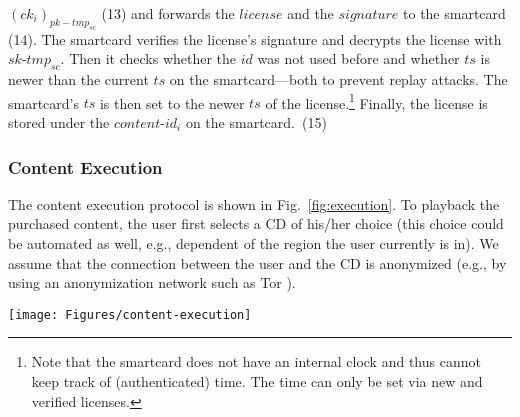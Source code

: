 \documentclass{llncs}
\newcommand{\refFig}[1]{Fig.~\ref{#1}}
\begin{document}
$(ck_i)_{pk-tmp_{sc}}$ (13) and forwards the $license$ and the $signature$ to the smartcard (14). The smartcard verifies the license's signature and decrypts the license with $sk$-$tmp_{sc}$. Then it checks whether the $id$ was not used before and whether $ts$ is newer than the current $ts$ on the smartcard---both to prevent replay attacks. The smartcard's $ts$ is then set to the newer $ts$ of the license.\footnote{Note that the smartcard does not have an internal clock and thus cannot keep track of (authenticated) time. The time can only be set via new and verified licenses.} Finally, the license is stored under the $content$-$id_{i}$ on the smartcard.~(15)


\subsubsection{Content Execution} \label{content_execution}

The content execution protocol is shown in \refFig{fig:execution}. To playback the purchased content, the user first selects a CD of his/her choice (this choice could be automated as well, e.g., dependent of the region the user currently is in). We assume that the connection between the user and the CD is anonymized (e.g., by using an anonymization network such as Tor \cite{tor}).

\begin{figure*}[ht]
	\centering
	\texttt{[image: Figures/content-execution]}
	\caption{Content execution protocol.}
	\label{fig:execution}
\end{figure*} 
\end{document}
